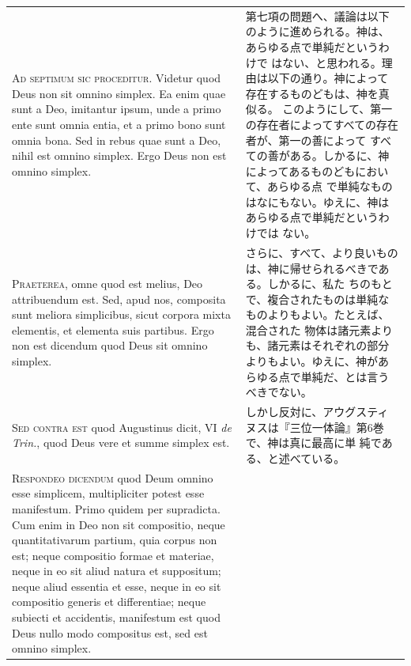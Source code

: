 \documentclass[paper=a4paper,fontsize=10pt,jafontsize=9pt,titlepage]{jlreq}
\begin{document}
\begin{longtable}{p{21em}p{21em}}

{\huge A}{\scshape d septimum sic proceditur}. Videtur quod Deus non sit
 omnino simplex. Ea enim quae sunt a Deo, imitantur ipsum, unde a primo
 ente sunt omnia entia, et a primo bono sunt omnia bona. Sed in rebus
 quae sunt a Deo, nihil est omnino simplex. Ergo Deus non est omnino
 simplex.

&

第七項の問題へ、議論は以下のように進められる。神は、あらゆる点で単純だというわけで
 はない、と思われる。理由は以下の通り。神によって存在するものどもは、神を真似る。
 このようにして、第一の存在者によってすべての存在者が、第一の善によって
 すべての善がある。しかるに、神によってあるものどもにおいて、あらゆる点
 で単純なものはなにもない。ゆえに、神はあらゆる点で単純だというわけでは
 ない。

\\

{\scshape Praeterea}, omne quod est melius, Deo attribuendum est. Sed,
 apud nos, composita sunt meliora simplicibus, sicut corpora mixta
 elementis, et elementa suis partibus. Ergo non est dicendum quod Deus
 sit omnino simplex.

&


さらに、すべて、より良いものは、神に帰せられるべきである。しかるに、私た
 ちのもとで、複合されたものは単純なものよりもよい。たとえば、混合された
 物体は諸元素よりも、諸元素はそれぞれの部分よりもよい。ゆえに、神があ
 らゆる点で単純だ、とは言うべきでない。

\\

{\scshape Sed contra est} quod Augustinus dicit, VI {\itshape de Trin.}, quod Deus vere et
 summe simplex est.

&

しかし反対に、アウグスティヌスは『三位一体論』第6巻で、神は真に最高に単
 純である、と述べている。

\\

{\scshape Respondeo dicendum} quod Deum omnino esse simplicem,
 multipliciter potest esse manifestum. Primo quidem per supradicta. Cum
 enim in Deo non sit compositio, neque quantitativarum partium, quia
 corpus non est; neque compositio formae et materiae, neque in eo sit
 aliud natura et suppositum; neque aliud essentia et esse, neque in eo
 sit compositio generis et differentiae; neque subiecti et accidentis,
 manifestum est quod Deus nullo modo compositus est, sed est omnino
 simplex.


\end{longtable}
\end{document}
